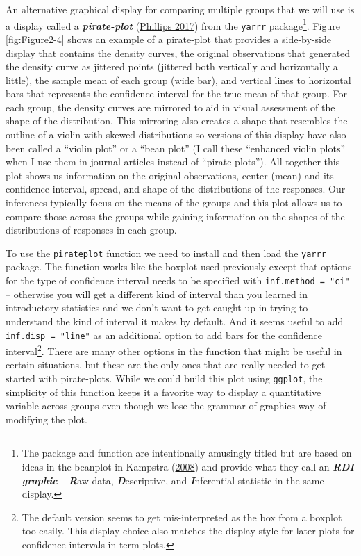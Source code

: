 \documentclass[
]{book}
\begin{document}
An alternative graphical display for comparing multiple groups that we will use is a display called a \textbf{\emph{pirate-plot}} (\protect\hyperlink{ref-R-yarrr}{Phillips 2017}) from the \texttt{yarrr} package\footnote{The package and function are intentionally amusingly titled but are based on ideas in the beanplot in Kampstra (\protect\hyperlink{ref-Kampstra2008}{2008}) and provide what they call an \textbf{\emph{RDI graphic}} -- \textbf{\emph{R}}aw data, \textbf{\emph{D}}escriptive, and \textbf{\emph{I}}nferential statistic in the same display.}.  Figure \ref{fig:Figure2-4}
shows an example of a pirate-plot that provides a side-by-side display that
contains the density curves, the original observations that generated the
density curve as jittered points (jittered both vertically and horizontally a little), the sample mean of each group (wide bar), and vertical lines to horizontal bars that represents the confidence interval for the true mean of that group. For each group, the density curves
are mirrored to aid in visual assessment of the shape of the distribution. This mirroring also
creates a shape that resembles the outline of a violin with skewed distributions so versions of this
display have also been called a ``violin plot'' or a ``bean plot'' (I call these ``enhanced violin plots'' when I use them in journal articles instead of ``pirate plots''). All together this plot shows us information
on the original observations, center (mean) and its confidence interval, spread, and shape of the distributions of the responses. Our inferences typically focus on the means of the groups and this plot allows
us to compare those across the groups while gaining information on the shapes
of the distributions of responses in each group.

\indent To use the \texttt{pirateplot} function  we need to install and then load the \texttt{yarrr}
package.
The function works like the boxplot used previously
except that options
for the type of confidence interval needs to be specified with \texttt{inf.method\ =\ "ci"} -- otherwise you will get a different kind of interval than you learned in introductory statistics and we don't want to get caught up in trying to understand the kind of interval it makes by default. And it seems useful to add \texttt{inf.disp\ =\ "line"} as an additional option to add bars for the confidence interval\footnote{The default version seems to get mis-interpreted as the box from a boxplot too easily. This display choice also matches the display style for later plots for confidence intervals in term-plots.}. There are many other options in the function that might be useful in certain situations, but these are the only ones that are really needed to get started with pirate-plots. While we could build this plot using \texttt{ggplot}, the simplicity of this function keeps it a favorite way to display a quantitative variable across groups even though we lose the grammar of graphics way of modifying the plot.
\end{document}
